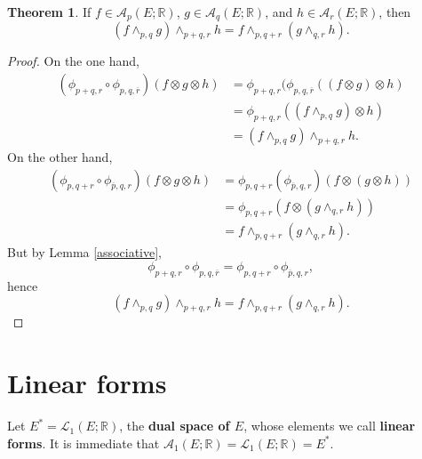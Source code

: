 \documentclass{article}
\theoremstyle{definition}
\newtheorem{theorem}{Theorem}
\theoremstyle{definition}
\begin{document}
\begin{theorem}
If $f \in \mathscr{A}_p(E;\mathbb{R})$, $g \in \mathscr{A}_q(E;\mathbb{R})$,
and $h \in \mathscr{A}_r(E;\mathbb{R})$, then 
\[
(f \wedge_{p,q} g) \wedge_{p+q,r} h = f \wedge_{p,q+r} (g \wedge_{q,r} h).
\]
\end{theorem}
\begin{proof}
On the one hand,
\begin{align*}
(\phi_{p+q,r} \circ \phi_{p,q,\overline{r}})(f \otimes g \otimes h)&=\phi_{p+q,r}(\phi_{p,q,\overline{r}}((f \otimes g) \otimes h)\\
&=\phi_{p+q,r}((f \wedge_{p,q} g) \otimes h)\\
&=(f \wedge_{p,q} g) \wedge_{p+q,r} h.
\end{align*}
On the other hand,
\begin{align*}
(\phi_{p,q+r} \circ \phi_{\overline{p},q,r})(f \otimes g \otimes h)&=\phi_{p,q+r}(\phi_{\overline{p},q,r})(f \otimes (g \otimes h))\\
&=\phi_{p,q+r}(f \otimes (g \wedge_{q,r} h))\\
&=f \wedge_{p,q+r} (g \wedge_{q,r} h).
\end{align*}
But by Lemma \ref{associative}, 
\[
\phi_{p+q,r} \circ \phi_{p,q,\overline{r}} = \phi_{p,q+r} \circ \phi_{\overline{p},q,r},
\]
hence
\[
(f \wedge_{p,q} g) \wedge_{p+q,r} h = f \wedge_{p,q+r} (g \wedge_{q,r} h).
\]
\end{proof}



\section{Linear forms}
Let $E^* = \mathscr{L}_1(E;\mathbb{R})$, the \textbf{dual space of $E$}, whose elements we call \textbf{linear forms}.
It is immediate that $\mathscr{A}_1(E;\mathbb{R}) = \mathscr{L}_1(E;\mathbb{R})=E^*$.
\end{document}
